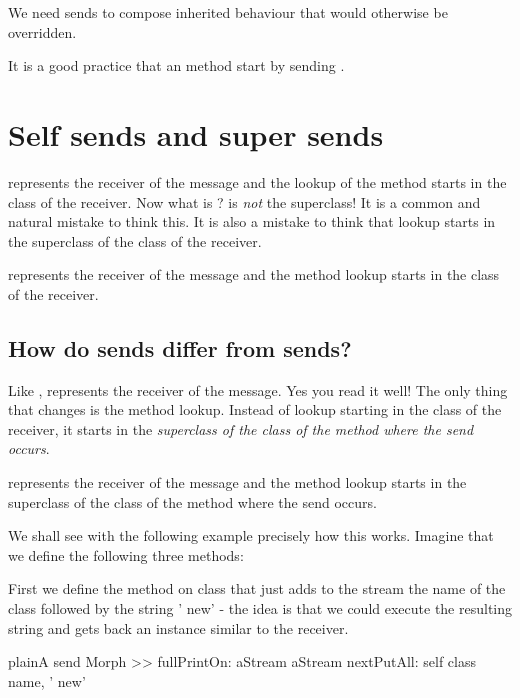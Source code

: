 \documentclass[10pt,twoside,english]{_support/latex/sbabook/sbabook}
\begin{document}
We need  sends to compose inherited behaviour that would otherwise be overridden.

\begin{important}
It is a good practice that an  method start by sending .
\end{important}
\section{Self sends and super sends}
 represents the receiver of the message and the lookup of the method
starts in the class of the receiver. Now what is ?  is
\textit{not} the superclass! It is a common and natural mistake to think this. It is
also a mistake to think that lookup starts in the superclass of the class of the
receiver.

\begin{important}
 represents the receiver of the message and the method lookup starts in the class of the receiver.
\end{important}
\subsection{How do  sends differ from  sends?}
Like ,  represents the receiver of the message. Yes you read it
well! The only thing that changes is the method lookup. Instead of lookup
starting in the class of the receiver, it starts in the \textit{superclass of the
class of the method where the  send occurs}.

\begin{important}
 represents the receiver of the message and the method lookup starts in the superclass of the class of the method where the  send occurs.
\end{important}

We shall see with the following example precisely how this works.
Imagine that we define the following three methods:

First we define the method  on class  that just adds to
the stream the name of the class followed by the string ' new' - the idea is
that we could execute the resulting string and gets back an instance similar to
the receiver.

\begin{listing}[float, label=scr:morphfullPrintOn]{plain}{A  send}
Morph >> fullPrintOn: aStream
	aStream nextPutAll: self class name, ' new'
\end{listing}
\end{document}
